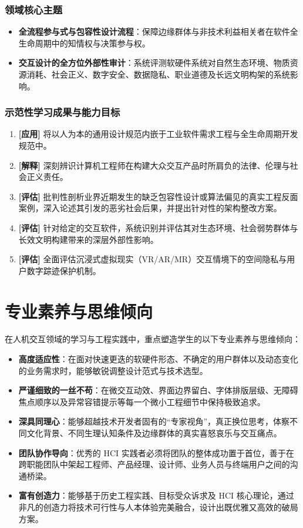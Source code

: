 \subsubsection{领域核心主题}
\begin{itemize}
    \item \textbf{全流程参与式与包容性设计流程}：保障边缘群体与非技术利益相关者在软件全生命周期中的知情权与决策参与权。
    \item \textbf{交互设计的全方位外部性审计}：系统评测软硬件系统对自然生态环境、物质资源消耗、社会正义、数字安全、数据隐私、职业道德及长远文明构架的系统影响。
\end{itemize}

\subsubsection{示范性学习成果与能力目标}
\begin{enumerate}
    \item \textbf{[应用]} 将以人为本的通用设计规范内嵌于工业软件需求工程与全生命周期开发规范中。
    \item \textbf{[解释]} 深刻辨识计算机工程师在构建大众交互产品时所肩负的法律、伦理与社会正义责任。
    \item \textbf{[评估]} 批判性剖析业界近期发生的缺乏包容性设计或算法偏见的真实工程反面案例，深入论述其引发的恶劣社会后果，并提出针对性的架构整改方案。
    \item \textbf{[评估]} 针对给定的交互软件，系统识别并评估其对生态环境、社会弱势群体与长效文明构建带来的深层外部性影响。
    \item \textbf{[评估]} 全面评估沉浸式虚拟现实（VR/AR/MR）交互情境下的空间隐私与用户数字踪迹保护机制。
\end{enumerate}

\section{专业素养与思维倾向}

在人机交互领域的学习与工程实践中，重点塑造学生的以下专业素养与思维倾向：
\begin{itemize}
    \item \textbf{高度适应性}：在面对快速更迭的软硬件形态、不确定的用户群体以及动态变化的业务需求时，能够敏锐调整设计范式与技术选型。
    \item \textbf{严谨细致的一丝不苟}：在微交互动效、界面边界留白、字体排版层级、无障碍焦点顺序以及异常容错提示等每一个微小工程细节中保持极致追求。
    \item \textbf{深具同理心}：能够超越技术开发者固有的“专家视角”，真正换位思考，体察不同文化背景、不同生理认知条件及边缘群体的真实喜怒哀乐与交互痛点。
    \item \textbf{团队协作导向}：优秀的 HCI 实践者必须将团队的整体成功置于首位，善于在跨职能团队中架起工程师、产品经理、设计师、业务人员与终端用户之间的沟通桥梁。
    \item \textbf{富有创造力}：能够基于历史工程实践、目标受众诉求及 HCI 核心理论，通过非凡的创造力将技术可行性与人本体验完美融合，设计出既优雅又高效的破局方案。
\end{itemize}

